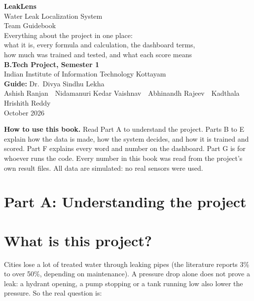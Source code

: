 \documentclass[11pt,a4paper]{article}
\begin{document}
\begin{titlepage}
\centering\vspace*{2.2cm}
{\Huge\bfseries\color{navy} LeakLens}\\[5pt]
{\LARGE Water Leak Localization System}\\[1.1cm]
{\Huge Team Guidebook}\\[0.5cm]
{\large Everything about the project in one place:\\ what it is, every formula and calculation, the dashboard terms,\\ how much was trained and tested, and what each score means}\\[1.6cm]
{\large\bfseries B.Tech Project, Semester 1}\\[2pt]
Indian Institute of Information Technology Kottayam\\[0.6cm]
\textbf{Guide:} Dr.\ Divya Sindhu Lekha\\[0.4cm]
Ashish Ranjan \,\textbullet\, Nidamanuri Kedar Vaishnav \,\textbullet\, Abhinandh Rajeev \,\textbullet\, Kadthala Hrishith Reddy\\[1.2cm]
October 2026\\[1.2cm]
\begin{minipage}{0.88\linewidth}\small
\textbf{How to use this book.} Read Part A to understand the project. Parts B to E explain how the data is made, how the system decides, and how it is trained and scored. Part F explains every word and number on the dashboard. Part G is for whoever runs the code. Every number in this book was read from the project's own result files. All data are simulated: no real sensors were used.
\end{minipage}
\end{titlepage}
\tableofcontents
\newpage

\section*{Part A: Understanding the project}
\section{What is this project?}
Cities lose a lot of treated water through leaking pipes (the literature reports 3\% to over 50\%, depending on maintenance). A pressure drop alone does not prove a leak: a hydrant opening, a pump stopping or a tank running low also lower the pressure. So the real question is:
\end{document}

